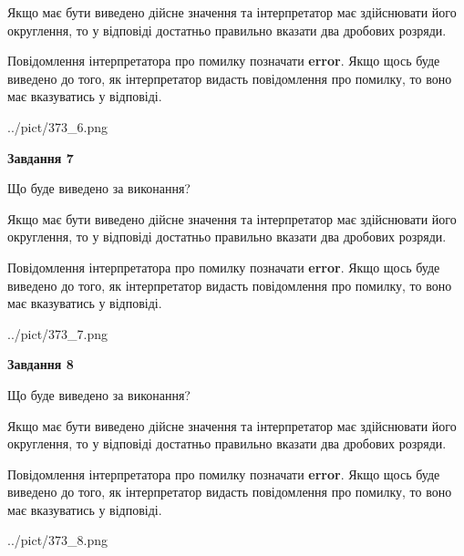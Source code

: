 \documentclass[12pt, ukrainian]{article}
\begin{document}
{\begin {Large}
Якщо має бути виведено дійсне значення та інтерпретатор має здійснювати його округлення, 
то у відповіді достатньо правильно вказати два дробових розряди.

Повідомлення інтерпретатора про помилку позначати \textbf{error}.
Якщо щось буде виведено до того, як інтерпретатор видасть повідомлення про помилку, 
то воно має вказуватись у відповіді. \par

\begin{center}
	{../pict/373_6.png}
\end{center}
\newpage

{\begin {center}\textbf{Завдання 7}\end {center}}\par
Що буде виведено за виконання? \par

Якщо має бути виведено дійсне значення та інтерпретатор має здійснювати його округлення, 
то у відповіді достатньо правильно вказати два дробових розряди.

Повідомлення інтерпретатора про помилку позначати \textbf{error}.
Якщо щось буде виведено до того, як інтерпретатор видасть повідомлення про помилку, 
то воно має вказуватись у відповіді. \par

\begin{center}
	{../pict/373_7.png}
\end{center}
\newpage

{\begin {center}\textbf{Завдання 8}\end {center}}\par
Що буде виведено за виконання? \par

Якщо має бути виведено дійсне значення та інтерпретатор має здійснювати його округлення, 
то у відповіді достатньо правильно вказати два дробових розряди.

Повідомлення інтерпретатора про помилку позначати \textbf{error}.
Якщо щось буде виведено до того, як інтерпретатор видасть повідомлення про помилку, 
то воно має вказуватись у відповіді. \par

\begin{center}
	{../pict/373_8.png}
\end{center}
\newpage


\end{Large}}
\end{document}
